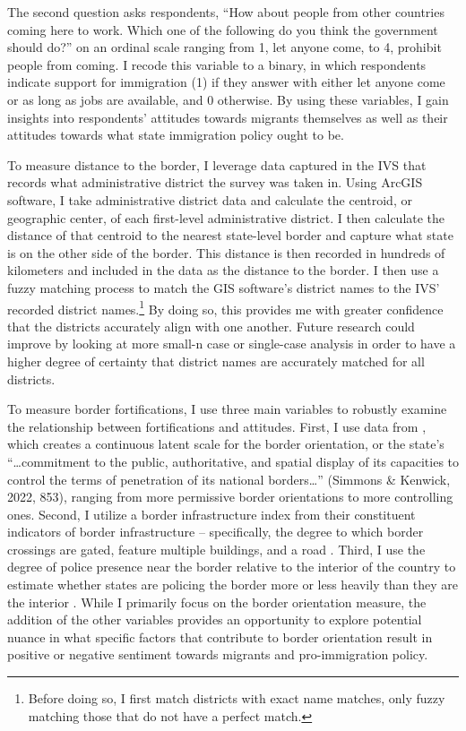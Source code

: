 \documentclass[12pt,]{article}
\begin{document}
The second question asks respondents, ``How about people from other
countries coming here to work. Which one of the following do you think
the government should do?'' on an ordinal scale ranging from 1, let
anyone come, to 4, prohibit people from coming. I recode this variable
to a binary, in which respondents indicate support for immigration (1)
if they answer with either let anyone come or as long as jobs are
available, and 0 otherwise. By using these variables, I gain insights
into respondents' attitudes towards migrants themselves as well as their
attitudes towards what state immigration policy ought to be.

To measure distance to the border, I leverage data captured in the IVS
that records what administrative district the survey was taken in. Using
ArcGIS software, I take administrative district data and calculate the
centroid, or geographic center, of each first-level administrative
district. I then calculate the distance of that centroid to the nearest
state-level border and capture what state is on the other side of the
border. This distance is then recorded in hundreds of kilometers and
included in the data as the distance to the border. I then use a fuzzy
matching process to match the GIS software's district names to the IVS'
recorded district names.\footnote{Before doing so, I first match
  districts with exact name matches, only fuzzy matching those that do
  not have a perfect match.} By doing so, this provides me with greater
confidence that the districts accurately align with one another. Future
research could improve by looking at more small-n case or single-case
analysis in order to have a higher degree of certainty that district
names are accurately matched for all districts.

To measure border fortifications, I use three main variables to robustly
examine the relationship between fortifications and attitudes. First, I
use data from \citet{simmons2022}, which creates a continuous latent
scale for the border orientation, or the state's ``\ldots commitment to
the public, authoritative, and spatial display of its capacities to
control the terms of penetration of its national borders\ldots{}''
(Simmons \& Kenwick, 2022, 853), ranging from more permissive border
orientations to more controlling ones. Second, I utilize a border
infrastructure index from their constituent indicators of border
infrastructure -- specifically, the degree to which border crossings are
gated, feature multiple buildings, and a road \citep{simmons2022}.
Third, I use the degree of police presence near the border relative to
the interior of the country to estimate whether states are policing the
border more or less heavily than they are the interior
\citep{simmons2022}. While I primarily focus on the border orientation
measure, the addition of the other variables provides an opportunity to
explore potential nuance in what specific factors that contribute to
border orientation result in positive or negative sentiment towards
migrants and pro-immigration policy.
\end{document}
